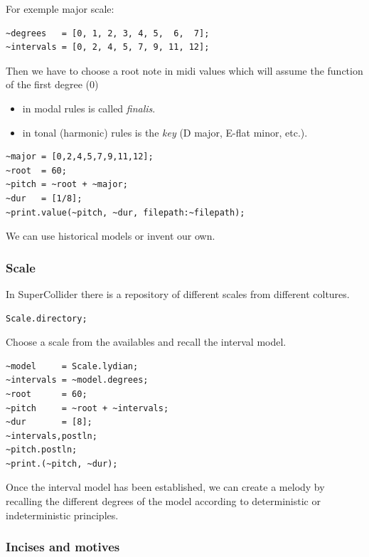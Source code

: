 For exemple major scale:

\begin{lstlisting}[frame=single] 
~degrees   = [0, 1, 2, 3, 4, 5,  6,  7];
~intervals = [0, 2, 4, 5, 7, 9, 11, 12];  
\end{lstlisting}

Then we have to choose a root note in midi values which will assume the function of the first degree (0)

\begin{itemize}
\tightlist
\item in modal rules is called \textit{finalis}.
\item in tonal (harmonic) rules is the \textit{key} (D major, E-flat minor, etc.).
\end{itemize}

\begin{lstlisting}[frame=single] 
~major = [0,2,4,5,7,9,11,12];  
~root  = 60;
~pitch = ~root + ~major;
~dur   = [1/8];
~print.value(~pitch, ~dur, filepath:~filepath); 
\end{lstlisting}

We can use historical models or invent our own.

\subsubsection{Scale}\label{scale}

In SuperCollider there is a repository of different scales from different coltures.

\begin{lstlisting}[frame=single] 
Scale.directory;
\end{lstlisting}

Choose a scale from the availables and recall the interval model.

\begin{lstlisting}[frame=single] 
~model     = Scale.lydian;    
~intervals = ~model.degrees; 
~root      = 60;
~pitch     = ~root + ~intervals;
~dur       = [8];
~intervals,postln;
~pitch.postln;
~print.(~pitch, ~dur); 
\end{lstlisting}

Once the interval model has been established, we can create a melody by recalling the different degrees of the model according to deterministic or indeterministic principles.

\subsubsection{Incises and motives}\label{incises-and-motives}

